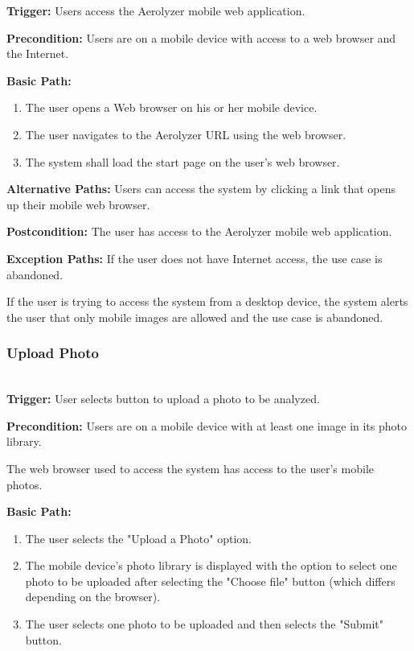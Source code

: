 \documentclass[letterpaper,10pt,draftclsnofoot,onecolumn]{IEEEtran}
\begin{document}
\begin{flushleft}
\textbf{Trigger: }
Users access the Aerolyzer mobile web application.

\textbf{Precondition: }
Users are on a mobile device with access to a web browser and the Internet.

\textbf{Basic Path: }
\begin{enumerate}
	\item The user opens a Web browser on his or her mobile device.
	\item The user navigates to the Aerolyzer URL using the web browser.
	\item The system shall load the start page on the user’s web browser.
\end{enumerate}

\textbf{Alternative Paths: }
Users can access the system by clicking a link that opens up their mobile web browser.

\textbf{Postcondition: }
The user has access to the Aerolyzer mobile web application.

\textbf{Exception Paths: }
If the user does not have Internet access, the use case is abandoned.

If the user is trying to access the system from a desktop device, the system alerts the user that only mobile images are allowed and the use case is abandoned.\\

\subsubsection{Upload Photo} \ \\

\textbf{Trigger: }
User selects button to upload a photo to be analyzed.

\textbf{Precondition: }
Users are on a mobile device with at least one image in its photo library.

The web browser used to access the system has access to the user’s mobile photos.

\textbf{Basic Path: }
\begin{enumerate}
	\item The user selects the "Upload a Photo" option.
	\item The mobile device’s photo library is displayed with the option to select one photo to be uploaded after selecting the "Choose file" button (which differs depending on the browser).
	\item The user selects one photo to be uploaded and then selects the "Submit" button.
\end{enumerate}


\end{flushleft}
\end{document}
